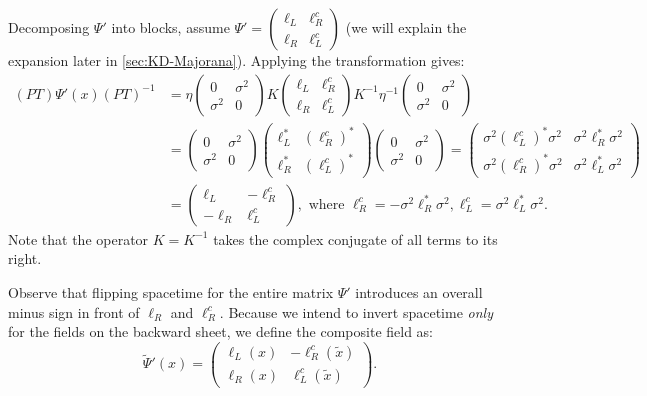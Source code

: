 Decomposing $\Psi'$ into blocks, assume $\Psi'=\begin{pmatrix}\ell_L&\ell_R^c\\ \ell_R & \ell_L^c\end{pmatrix}$ (we will explain the expansion later in \cref{sec:KD-Majorana}). Applying the transformation gives:
\begin{equation}
\begin{aligned}
    (PT)\Psi'(x) (PT)^{-1}&=\eta\begin{pmatrix}0&\sigma^2\\ \sigma^2 & 0\end{pmatrix} K\begin{pmatrix}\ell_L&\ell_R^c\\ \ell_R & \ell_L^c\end{pmatrix} K^{-1} \eta^{-1}\begin{pmatrix}0&\sigma^2\\ \sigma^2 & 0\end{pmatrix}\\
    &=\begin{pmatrix}0&\sigma^2\\ \sigma^2 & 0\end{pmatrix} \begin{pmatrix}\ell_L^*&(\ell_R^c)^*\\ \ell_R^* & (\ell_L^c)^*\end{pmatrix}  \begin{pmatrix}0&\sigma^2\\ \sigma^2 & 0\end{pmatrix}=\begin{pmatrix}\sigma^2(\ell_L^c)^*\sigma^2&\sigma^2\ell_R^*\sigma^2\\ \sigma^2(\ell_R^c)^*\sigma^2 & \sigma^2\ell_L^*\sigma^2\end{pmatrix}\\
    &=\begin{pmatrix}\ell_L&-\ell_R^c\\ -\ell_R & \ell_L^c\end{pmatrix}, \text{ where }\ell_R^c=-\sigma^2\ell_R^*\sigma^2, \ell_L^c=\sigma^2\ell_L^*\sigma^2.
\end{aligned}
\end{equation}
Note that the operator $K=K^{-1}$ takes the complex conjugate of all terms to its right. 

Observe that flipping spacetime for the entire matrix $\Psi'$ introduces an overall minus sign in front of $\ell_R$ and $\ell_R^c$. Because we intend to invert spacetime \textit{only} for the fields on the backward sheet, we define the composite field as: 
\[ \tilde \Psi'(x)=\begin{pmatrix}\ell_L(x)&-\ell_R^c(\tilde x)\\ \ell_R(x) & \ell_L^c(\tilde x)\end{pmatrix}.\]


